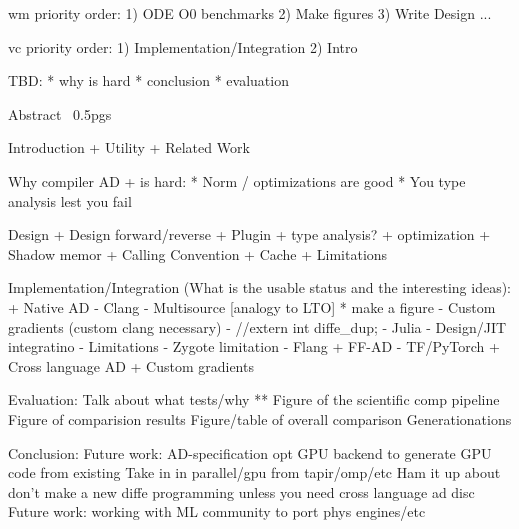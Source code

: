 wm priority order:
1) ODE O0 benchmarks
2) Make figures
3) Write Design
...

vc priority order:
1) Implementation/Integration
2) Intro

TBD:
* why is hard
* conclusion
* evaluation

Abstract ~0.5pgs

Introduction
+ Utility
+ Related Work

Why compiler AD + is hard:
* Norm / optimizations are good 
* You type analysis lest you fail 

Design
 + Design forward/reverse
 + Plugin
 + type analysis?
 + optimization
 + Shadow memor
 + Calling Convention
 + Cache
 + Limitations

Implementation/Integration (What is the usable status and the interesting ideas):
 + Native AD
   - Clang
     - Multisource [analogy to LTO]
       * make a figure 
     - Custom gradients (custom clang necessary)
     - //extern int diffe\_dup;
   - Julia
     - Design/JIT integratino
     - Limitations
     - Zygote limitation \wmnote{}
   - Flang
 + FF-AD
   - TF/PyTorch 
 + Cross language AD
 + Custom gradients

Evaluation:
 Talk about what tests/why ** 
 Figure of the scientific comp pipeline
 Figure of comparision results 
 Figure/table of overall comparison 
 Generationations
 
Conclusion:
 Future work: AD-specification opt
 GPU backend to generate GPU code from existing
 Take in in parallel/gpu from tapir/omp/etc
 Ham it up about don't make a new diffe programming unless you need
 cross language ad disc
 Future work: working with ML community to port phys engines/etc